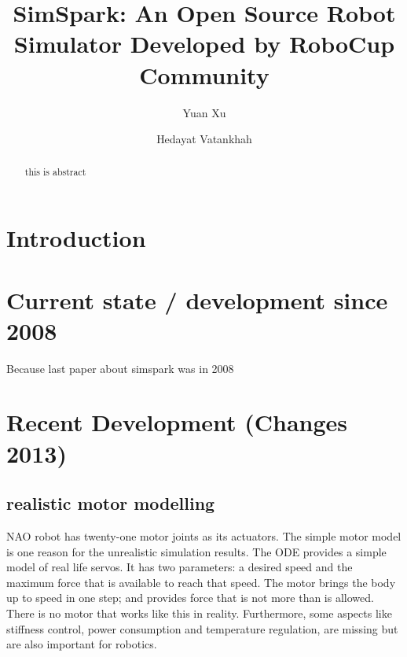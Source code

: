 \documentclass{llncs}
\begin{document}
\title{SimSpark: An Open Source Robot Simulator Developed by RoboCup Community}

\author{Yuan Xu \and Hedayat Vatankhah}


\maketitle

\begin{abstract}
  this is abstract
\end{abstract}

\section{Introduction}

\cite{Boedecker2008,OR05}


\section{Current state / development since 2008}
Because last paper about simspark was in 2008

\section{Recent Development (Changes 2013)}


\subsection{realistic motor modelling}
NAO robot has twenty-one motor joints as its actuators.
The simple motor model is one reason for the unrealistic simulation results.
The ODE provides a simple model of real life servos.
It has two parameters: a desired speed and the maximum force that is available to reach that speed. The motor brings the body up to speed in one step; and provides force that is not more than is allowed.
There is no motor that works like this in reality.
Furthermore, some aspects like stiffness control, power consumption and temperature regulation, are missing but are also important for robotics.
\end{document}
